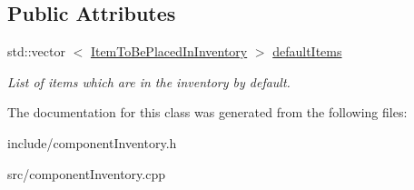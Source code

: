 \subsection*{\-Public \-Attributes}
\begin{DoxyCompactItemize}
\item 
\hypertarget{classComponentTemplateInventory_a36649852feacfb2274e8cc6da4a1b16d}{
std\-::vector\*
$<$ \hyperlink{structItemToBePlacedInInventory}{\-Item\-To\-Be\-Placed\-In\-Inventory} $>$ \hyperlink{classComponentTemplateInventory_a36649852feacfb2274e8cc6da4a1b16d}{default\-Items}}
\label{d8/d45/classComponentTemplateInventory_a36649852feacfb2274e8cc6da4a1b16d}

\begin{DoxyCompactList}\small\item\em \-List of items which are in the inventory by default. \end{DoxyCompactList}\end{DoxyCompactItemize}


\-The documentation for this class was generated from the following files\-:\begin{DoxyCompactItemize}
\item 
include/component\-Inventory.\-h\item 
src/component\-Inventory.\-cpp\end{DoxyCompactItemize}
